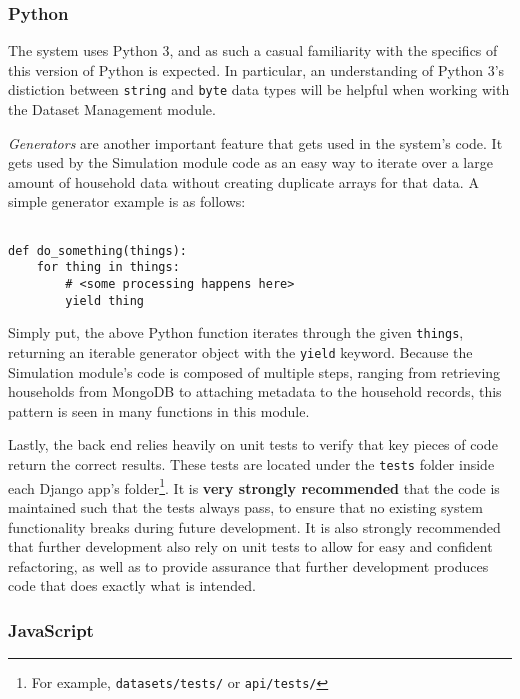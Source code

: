 \subsubsection{Python}

The system uses Python 3, and as such a casual familiarity with the specifics of this version of Python is expected. In particular, an understanding of Python 3's distiction between \texttt{string} and \texttt{byte} data types will be helpful when working with the Dataset Management module.

\emph{Generators} are another important feature that gets used in the system's code. It gets used by the Simulation module code as an easy way to iterate over a large amount of household data without creating duplicate arrays for that data. A simple generator example is as follows:

\begin{lstlisting}

def do_something(things):
    for thing in things:
        # <some processing happens here>
        yield thing

\end{lstlisting}

Simply put, the above Python function iterates through the given \texttt{things}, returning an iterable generator object with the \texttt{yield} keyword. Because the Simulation module's code is composed of multiple steps, ranging from retrieving households from MongoDB to attaching metadata to the household records, this pattern is seen in many functions in this module.

Lastly, the back end relies heavily on unit tests to verify that key pieces of code return the correct results. These tests are located under the \texttt{tests} folder inside each Django app's folder\footnote{For example, \texttt{datasets/tests/} or \texttt{api/tests/}}. It is \textbf{very strongly recommended} that the code is maintained such that the tests always pass, to ensure that no existing system functionality breaks during future development. It is also strongly recommended that further development also rely on unit tests to allow for easy and confident refactoring, as well as to provide assurance that further development produces code that does exactly what is intended.


\subsubsection{JavaScript} 

